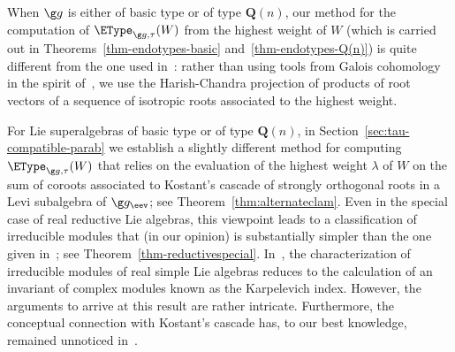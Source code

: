 \documentclass[12pt]{amsart}
\begin{document}
 When $\g g$ is either of basic type or of type $\mathbf Q(n)$, our method for the  computation of $\EType_{\g g,\tau}(W)$  from the highest weight of $W$ 
 (which is carried out in  Theorems~\ref{thm-endotypes-basic} and~\ref{thm-endotypes-Q(n)}) is quite different from the one used in~\cite{Hayashi}: rather than using tools from Galois cohomology in the spirit of~\cite{Tits}, we use the Harish-Chandra projection of products of root vectors of a sequence of isotropic roots associated to the highest weight. 

For Lie superalgebras of basic type or of type $\mathbf Q(n)$, 
in Section~\ref{sec:tau-compatible-parab} we establish a slightly different method for computing $\EType_{\g g,\tau}(W)$ that relies on the  evaluation of the highest weight  $\lambda$ of $W$ on the sum of coroots associated to Kostant's cascade of strongly orthogonal roots in a Levi subalgebra of $\g g_\eev$; see Theorem~\ref{thm:alternateclam}. 
Even in the special case of real reductive Lie algebras, this viewpoint leads to a classification of irreducible modules that (in our opinion) is substantially simpler than the one given in~\cite{Onishchik}; see Theorem~\ref{thm-reductivespecial}. 
In~\cite{Onishchik}, the characterization of irreducible modules of real simple Lie algebras reduces to the calculation of an  invariant of complex modules known as the Karpelevich index. However, the arguments to arrive at this result are rather intricate. Furthermore, the conceptual connection with Kostant's cascade has, to our best knowledge, remained unnoticed in~\cite{Onishchik}. 
\end{document}

